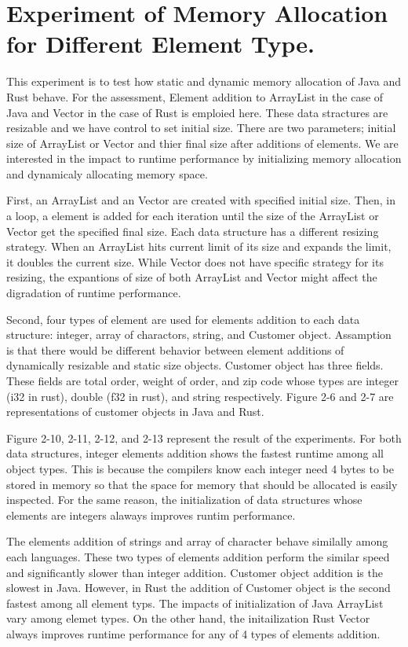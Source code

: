\section{Experiment of Memory Allocation for Different Element Type.}
\label{sec:history}
This experiment is to test how static and dynamic memory allocation of Java and Rust behave. For the assessment, Element addition to ArrayList in the case of Java and Vector in the case of Rust 
is emploied here. These data stractures are resizable and we have control to set initial size. There are two parameters; initial size of ArrayList or Vector and thier final size after additions of elements. 
We are interested in the impact to runtime performance by initializing memory allocation and dynamicaly allocating memory space.

First, an ArrayList and an Vector are created with specified initial size. Then, in a loop, a element is added for each iteration until the size of the ArrayList or Vector get the specified final size. 
Each data structure has a different resizing strategy. When an ArrayList hits current limit of its size and expands the limit, it doubles the current size.  
While Vector does not have specific strategy for its resizing, the expantions of size of both ArrayList and Vector might affect the digradation of runtime performance.

Second, four types of element are used for elements addition to each data structure: integer, array of charactors, string, and Customer object. 
Assamption is that there would be different behavior between element additions of dynamically resizable and static size objects. 
Customer object has three fields. These fields are total order, weight of order, and zip code whose types are integer (i32 in rust), double (f32 in rust), and string respectively.
Figure 2-6 and 2-7 are representations of customer objects in Java and Rust.

Figure 2-10, 2-11, 2-12, and 2-13 represent the result of the experiments. For both data structures, integer elements addition shows the fastest runtime among all object types. 
This is because the compilers know each integer need 4 bytes to be stored in memory so that the space for memory that should be allocated is easily inspected. 
For the same reason, the initialization of data structures whose elements are integers alaways improves runtim performance.

The elements addition of strings and array of character behave similally among each languages. These two types of elements addition perform the similar speed and significantly slower than integer addition. 
Customer object addition is the slowest in Java. However, in Rust the addition of Customer object is the second fastest among all element typs.
The impacts of initialization of Java ArrayList vary among elemet types. On the other hand, the initailization Rust Vector always improves runtime performance for any of 4 types of elements addition.


